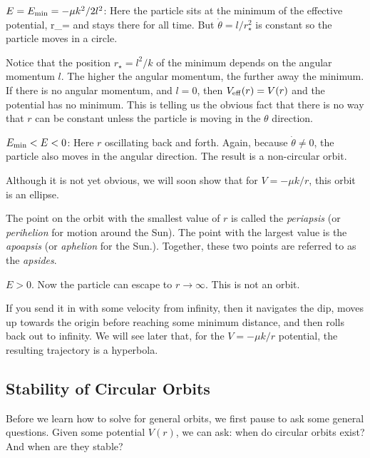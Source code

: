 \begin{itemize}{\co
\item $E=E_{\rm min}=-\mu k^2/2l^2$: Here the particle sits at the minimum of the effective potential,
%
\be r_\star= \ee
%
and stays there  for all time. But $\dot{\theta} = l/r_\star^2$ is constant so the particle moves in a circle.}



\vskip 3mm
Notice that the position $r_\star=l^2/k$ of the minimum depends on the angular momentum $l$. The higher the angular momentum, the further away the minimum. If there is no angular momentum, and $l=0$, then $V_{\rm eff}(r)= V(r)$ and the potential has no minimum. This is telling us the obvious fact that there is no way that $r$ can be constant unless the particle is moving in the $\theta$ direction.



{\co 
\item  $E_{\rm min}<E<0$: Here $r$ oscillating back and forth. Again, because $\dot{\theta}\neq 0$, the particle also moves in the angular direction. The result is a non-circular orbit.}  Although it is not yet obvious, we will soon show that for $V=-\mu k/r$, this orbit is an ellipse.

\vskip 3mm
{\co The point on the orbit with the smallest value of $r$ is called the {\it periapsis} (or {\it perihelion} for motion around the Sun). The point with the largest value is the {\it apoapsis} (or {\it aphelion} for the Sun.).} Together, these two points are referred to as the {\it apsides}.  

\vskip 3mm
{\co \item $E>0$. Now the particle can escape to $r\rightarrow \infty$. This is not an orbit.}  If you send it in with some velocity from infinity, then it navigates the dip, moves up towards the origin before reaching some minimum distance, and  then rolls back out to infinity. We will see later that, for the $V=-\mu k/r$ potential, the resulting trajectory is a hyperbola. 
\end{itemize}

\vskip 2mm
\subsection{Stability of Circular Orbits}

Before we learn how to solve for general orbits, we first pause to ask some general questions. Given some potential $V(r)$, we can ask: when do circular orbits exist? And when are they stable?

